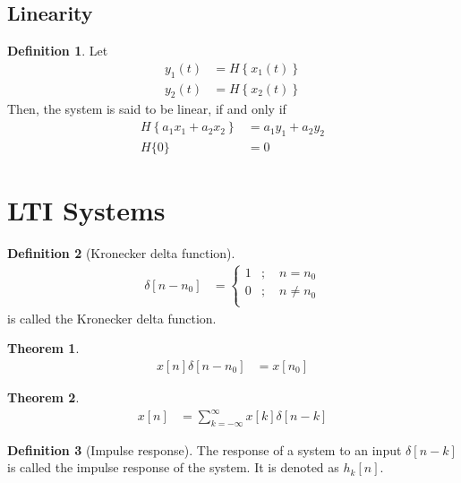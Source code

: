 \documentclass[titlepage, fleqn, a4paper, 12pt, twoside]{article}
\theoremstyle{definition}
\newtheorem{definition}{Definition}
\theoremstyle{theorem}
\newtheorem{theorem}{Theorem}
\begin{document}
\subsection{Linearity}

\begin{definition}
	Let
	\begin{align*}
		y_1(t) & = H\left\{ x_1(t) \right\} \\
		y_2(t) & = H\left\{ x_2(t) \right\}
	\end{align*}
	Then, the system is said to be linear, if and only if
	\begin{align*}
		H\left\{ a_1 x_1 + a_2 x_2 \right\} & = a_1 y_1 + a_2 y_2 \\
		H\{0\}                              & = 0
	\end{align*}
\end{definition}

\section{LTI Systems}

\begin{definition}[Kronecker delta function]
	\begin{align*}
		\delta[n - n_0] &=
			\begin{cases}
				1 & ;\quad n = n_0    \\
				0 & ;\quad n \neq n_0 \\
			\end{cases}
	\end{align*}
	is called the Kronecker delta function.
\end{definition}

\begin{theorem}
	\begin{align*}
		x[n] \delta[n - n_0] & = x[n_0]
	\end{align*}
\end{theorem}

\begin{theorem}
	\begin{align*}
		x[n] & = \sum\limits_{k = -\infty}^{\infty} x[k] \delta[n - k]
	\end{align*}
\end{theorem}

\begin{definition}[Impulse response]
	The response of a system to an input $\delta[n - k]$ is called the impulse response of the system.
	It is denoted as $h_k[n]$.
\end{definition}
\end{document}
